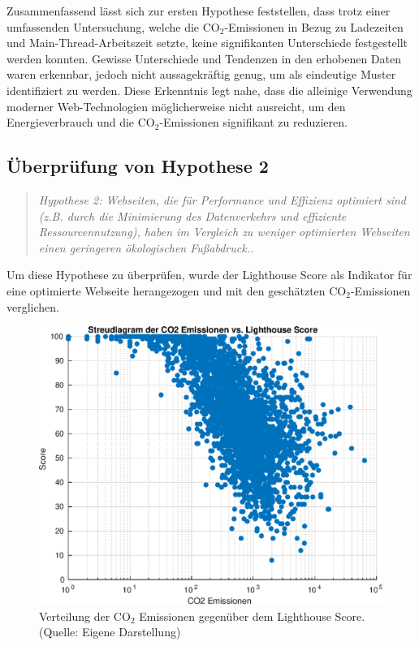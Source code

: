 \documentclass[Bachelor,BIF,german,IEEE]{BASE/twbook}
\begin{document}
\noindent Zusammenfassend lässt sich zur ersten Hypothese feststellen, dass trotz einer umfassenden Untersuchung, welche die CO$_2$-Emissionen in Bezug zu Ladezeiten und Main-Thread-Arbeitszeit setzte, keine signifikanten Unterschiede festgestellt werden konnten. Gewisse Unterschiede und Tendenzen in den erhobenen Daten waren erkennbar, jedoch nicht aussagekräftig genug, um als eindeutige Muster identifiziert zu werden. Diese Erkenntnis legt nahe, dass die alleinige Verwendung moderner Web-Technologien möglicherweise nicht ausreicht, um den Energieverbrauch und die CO$_2$-Emissionen signifikant zu reduzieren.

\clearpage


\subsection{Überprüfung von Hypothese 2}

\begin{center}
\begin{quote}
\textit{Hypothese 2: Webseiten, die für Performance und Effizienz optimiert sind (z.B. durch die Minimierung des Datenverkehrs und effiziente Ressourcennutzung), haben im Vergleich zu weniger optimierten Webseiten einen geringeren ökologischen Fußabdruck..}
\end{quote}
\end{center}

\noindent Um diese Hypothese zu überprüfen, wurde der Lighthouse Score als Indikator für eine optimierte Webseite herangezogen und mit den geschätzten CO$_2$-Emissionen verglichen. 

\begin{figure}[htp]
\centering
\includegraphics[width=1.0\linewidth]{matlab/scatterCO2vsScore.eps}
\caption{Verteilung der CO$_2$ Emissionen gegenüber dem Lighthouse Score. (Quelle: Eigene Darstellung)}
\label{Abb7}
\end{figure}
\end{document}

